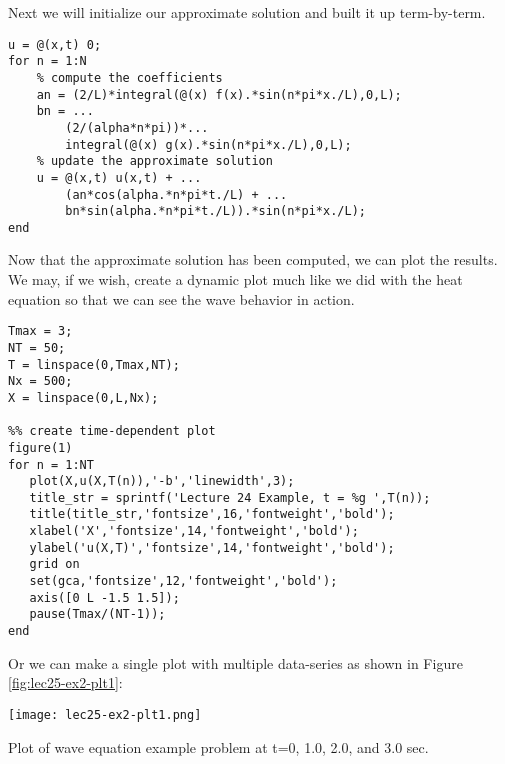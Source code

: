 \vspace{3.5cm}

\noindent Next we will initialize our approximate solution and built it up term-by-term.

\begin{lstlisting}[style=myMatlab, name=lec25-ex2]
u = @(x,t) 0;
for n = 1:N
    % compute the coefficients
    an = (2/L)*integral(@(x) f(x).*sin(n*pi*x./L),0,L);
    bn = ...
        (2/(alpha*n*pi))*...
        integral(@(x) g(x).*sin(n*pi*x./L),0,L);
    % update the approximate solution
    u = @(x,t) u(x,t) + ...
        (an*cos(alpha.*n*pi*t./L) + ...
        bn*sin(alpha.*n*pi*t./L)).*sin(n*pi*x./L); 
end
\end{lstlisting}

\vspace{0.25cm}

\noindent Now that the approximate solution has been computed, we can plot the results.  We may, if we wish, create a dynamic plot much like we did with the heat equation so that we can see the wave behavior in action.

\begin{lstlisting}[style=myMatlab, name=lec25-ex2]
%% make discrete space and time space vectors
Tmax = 3;
NT = 50;
T = linspace(0,Tmax,NT);
Nx = 500;
X = linspace(0,L,Nx);

%% create time-dependent plot
figure(1)
for n = 1:NT
   plot(X,u(X,T(n)),'-b','linewidth',3); 
   title_str = sprintf('Lecture 24 Example, t = %g ',T(n));
   title(title_str,'fontsize',16,'fontweight','bold');
   xlabel('X','fontsize',14,'fontweight','bold');
   ylabel('u(X,T)','fontsize',14,'fontweight','bold');
   grid on
   set(gca,'fontsize',12,'fontweight','bold');
   axis([0 L -1.5 1.5]);
   pause(Tmax/(NT-1));
end
\end{lstlisting}

\vspace{0.25cm}

\noindent Or we can make a single plot with multiple data-series as shown in Figure \ref{fig:lec25-ex2-plt1}:
\begin{marginfigure}
\texttt{[image: lec25-ex2-plt1.png]}
\caption{Plot of wave equation example problem at t=0, 1.0, 2.0, and 3.0 sec.}
\label{fig:lec25-ex2-plt1}
\end{marginfigure}

